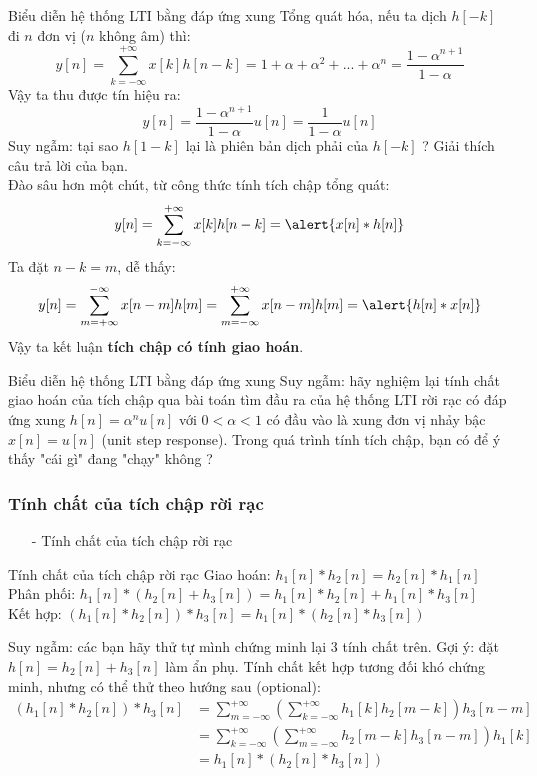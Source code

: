 \documentclass[8pt]{beamer}
\begin{document}
\begin{frame}{Biểu diễn hệ thống LTI bằng đáp ứng xung}
Tổng quát hóa, nếu ta dịch $h[-k]$ đi $n$ đơn vị ($n$ không âm) thì:
$$y[n]=\sum_{k=-\infty}^{+\infty}x[k]h[n-k]=1+\alpha+\alpha^2+...+\alpha^n=\frac{1-\alpha^{n+1}}{1-\alpha}$$
Vậy ta thu được tín hiệu ra: $$y[n]=\frac{1-\alpha^{n+1}}{1-\alpha}u[n]=\frac{1}{1-\alpha}u[n]$$
Suy ngẫm: tại sao $h[1-k]$ lại là phiên bản \alert{dịch phải} của $h[-k]$ ? Giải thích câu trả lời của bạn.
\\ Đào sâu hơn một chút, từ công thức tính tích chập tổng quát:
$$y[n]=\sum_{k=-\infty}^{+\infty}x[k]h[n-k]=\alert{x[n]*h[n]}$$
Ta đặt $n-k=m$, dễ thấy:
$$y[n]=\sum_{m=+\infty}^{-\infty}x[n-m]h[m]=\sum_{m=-\infty}^{+\infty}x[n-m]h[m]=\alert{h[n]*x[n]}$$
Vậy ta kết luận \textbf{tích chập có tính giao hoán}.
\end{frame}
\begin{frame}{Biểu diễn hệ thống LTI bằng đáp ứng xung}
Suy ngẫm: hãy nghiệm lại tính chất giao hoán của tích chập qua bài toán tìm đầu ra của hệ thống LTI rời rạc có đáp ứng xung $h[n]=\alpha^n u[n]$ với $0<\alpha<1$ có đầu vào là xung đơn vị nhảy bậc $x[n]=u[n]$ (unit step response). Trong quá trình tính tích chập, bạn có để ý thấy "cái gì" đang "chạy" không ?
\subsubsection{Tính chất của tích chập rời rạc}
\begin{itemize}
	\item[-] Tính chất của tích chập rời rạc
\end{itemize}
\begin{block}{Tính chất của tích chập rời rạc}
	Giao hoán: $h_{1}[n]*h_{2}[n]=h_{2}[n]*h_{1}[n]$\\
	Phân phối: $h_{1}[n]*(h_{2}[n]+h_{3}[n])=h_{1}[n]*h_{2}[n]+h_{1}[n]*h_{3}[n]$\\
	Kết hợp: $(h_{1}[n]*h_{2}[n])*h_{3}[n]=h_{1}[n]*(h_{2}[n]*h_{3}[n])$
\end{block}
Suy ngẫm: các bạn hãy thử tự mình chứng minh lại $3$ tính chất trên. Gợi ý: đặt $h[n]=h_{2}[n]+h_{3}[n]$ làm ẩn phụ. Tính chất kết hợp tương đối khó chứng minh, nhưng có thể thử theo hướng sau (optional):
\begin{equation*}
	\begin{split}
		(h_{1}[n]*h_{2}[n])*h_{3}[n]&=\sum_{m=-\infty}^{+\infty}\left(\sum_{k=-\infty}^{+\infty}h_{1}[k]h_{2}[m-k]\right)h_{3}[n-m]\\
					    &=\sum_{k=-\infty}^{+\infty}\left(\sum_{m=-\infty}^{+\infty}h_{2}[m-k]h_{3}[n-m]\right)h_{1}[k]\\
					    &=h_{1}[n]*(h_{2}[n]*h_{3}[n])\\
	\end{split}
\end{equation*}
\end{frame}
\end{document}
